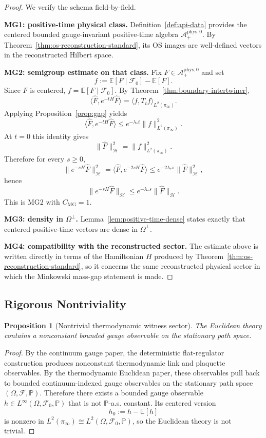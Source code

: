 \documentclass[11pt]{article}
\newtheorem{proposition}[theorem]{Proposition}
\theoremstyle{definition}
\theoremstyle{remark}
\newcommand{\mcA}{\mathcal A}
\newcommand{\mcH}{\mathcal H}
\begin{document}
\begin{proof}
We verify the schema field-by-field.

\textbf{MG1: positive-time physical class.}
Definition~\ref{def:api-data} provides the centered bounded gauge-invariant
positive-time algebra $\mcA^{\mathrm{phys},0}_+$.  By
Theorem~\ref{thm:os-reconstruction-standard}, its OS images are well-defined
vectors in the reconstructed Hilbert space.

\textbf{MG2: semigroup estimate on that class.}
Fix $F\in\mcA^{\mathrm{phys},0}_+$ and set
\[
f:=\mathbb E[F\mid\mathcal F_0]-\mathbb E[F].
\]
Since $F$ is centered, $f=\mathbb E[F\mid\mathcal F_0]$.  By
Theorem~\ref{thm:boundary-intertwiner},
\[
\langle \widehat F,e^{-tH}\widehat F\rangle
=
\langle f,T_t f\rangle_{L^2(\pi_\infty)}.
\]
Applying Proposition~\ref{prop:gap} yields
\[
\langle \widehat F,e^{-tH}\widehat F\rangle
\le
e^{-\lambda_* t}\|f\|_{L^2(\pi_\infty)}^2.
\]
At $t=0$ this identity gives
\[
\|\widehat F\|_{\mcH}^2=\|f\|_{L^2(\pi_\infty)}^2.
\]
Therefore for every $s\ge0$,
\[
\|e^{-sH}\widehat F\|_{\mcH}^2
=
\langle \widehat F,e^{-2sH}\widehat F\rangle
\le
e^{-2\lambda_* s}\|\widehat F\|_{\mcH}^2,
\]
hence
\[
\|e^{-sH}\widehat F\|_{\mcH}
\le
e^{-\lambda_* s}\|\widehat F\|_{\mcH}.
\]
This is MG2 with $C_{\mathrm{MG}}=1$.

\textbf{MG3: density in $\Omega^\perp$.}
Lemma~\ref{lem:positive-time-dense} states exactly that centered positive-time
vectors are dense in $\Omega^\perp$.

\textbf{MG4: compatibility with the reconstructed sector.}
The estimate above is written directly in terms of the Hamiltonian $H$ produced
by Theorem~\ref{thm:os-reconstruction-standard}, so it concerns the same
reconstructed physical sector in which the Minkowski mass-gap statement is made.
\end{proof}

\subsection{Rigorous Nontriviality}

\begin{proposition}[Nontrivial thermodynamic witness sector]
\label{prop:scalar-nontriviality}
The Euclidean theory contains a nonconstant bounded gauge observable on the
stationary path space.
\end{proposition}

\begin{proof}
By the continuum gauge paper, the deterministic flat-regulator construction
produces nonconstant thermodynamic link and plaquette observables.  By the
thermodynamic Euclidean paper, these observables pull back to bounded
continuum-indexed gauge observables on the stationary path space
$(\Omega,\mathcal F,\mathbb P)$.  Therefore there exists a bounded gauge observable
$h\in L^\infty(\Omega,\mathcal F_0,\mathbb P)$ that is not $\mathbb P$-a.s. constant.
Its centered version
\[
h_0:=h-\mathbb E[h]
\]
is nonzero in $L^2(\pi_\infty)\cong L^2(\Omega,\mathcal F_0,\mathbb P)$, so the
Euclidean theory is not trivial.
\end{proof}
\end{document}
